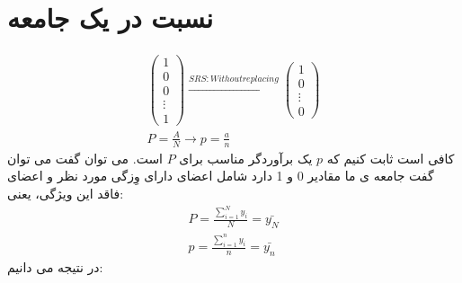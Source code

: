 \section*{نسبت در یک جامعه}
\begin{gather*}
	\begin{pmatrix}
		1 \\
		0 \\
		0 \\
		\vdots \\
		1
	\end{pmatrix}
	\overset{SRS:Without replacing}{\longrightarrow}
	\begin{pmatrix}
		1\\
		0\\
		\vdots \\
		0
	\end{pmatrix}
	\\
	P=\frac{A}{N}\longrightarrow p=\frac{a}{n}
\end{gather*}
کافی است ثابت کنیم که 
$p$
یک برآوردگر مناسب برای 
$P$
است.
می توان گفت می توان گفت جامعه ی ما مقادیر 0 و 1 دارد شامل اعضای دارای وِزگی مورد نظر و اعضای فاقد این ویژگی، یعنی:
\begin{gather*}
	P=\frac{\sum_{i=1}^{N}y_i}{N}=\bar{y_N} \\
	p=\frac{\sum_{i=1}^ny_i}{n}=\bar{y_n}
\end{gather*}
در نتیجه می دانیم:
